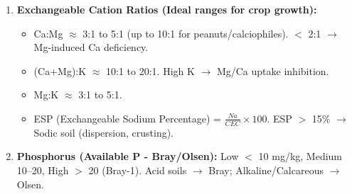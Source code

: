 \documentclass[11pt]{article}
\begin{document}
\begin{methode}
\begin{enumerate}
\item \textbf{Exchangeable Cation Ratios (Ideal ranges for crop growth):}
      \begin{itemize}
      \item Ca:Mg $\approx$ 3:1 to 5:1 (up to 10:1 for peanuts/calciophiles). $<$ 2:1 $\rightarrow$ Mg-induced Ca deficiency.
      \item (Ca+Mg):K $\approx$ 10:1 to 20:1. High K $\rightarrow$ Mg/Ca uptake inhibition.
      \item Mg:K $\approx$ 3:1 to 5:1.
      \item ESP (Exchangeable Sodium Percentage) = $\frac{Na}{CEC} \times 100$. ESP $>$ 15\% $\rightarrow$ Sodic soil (dispersion, crusting).
      \end{itemize}
\item \textbf{Phosphorus (Available P - Bray/Olsen):} Low $<$ 10 mg/kg, Medium 10--20, High $>$ 20 (Bray-1). Acid soils $\rightarrow$ Bray; Alkaline/Calcareous $\rightarrow$ Olsen.
\end{enumerate}
\end{methode}
\end{document}

